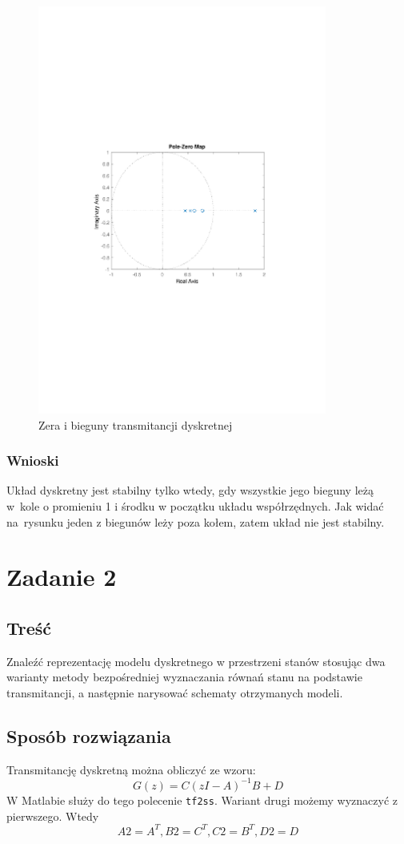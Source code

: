 \documentclass{article}
\begin{document}
\begin{figure}[H]
\centering
\includegraphics[clip, trim=3cm 9cm 3cm 9.5cm, width=9.5cm]{../rys/zad1_rys2.pdf}
\caption{Zera i bieguny transmitancji dyskretnej}
\label{fig:rys 2}
\end{figure}

\subsubsection{Wnioski}
Układ dyskretny jest stabilny tylko wtedy, gdy wszystkie jego bieguny leżą w~kole o promieniu 1 i środku w początku układu współrzędnych. Jak widać na~rysunku jeden z biegunów leży poza kołem, zatem układ nie jest stabilny.
\section{Zadanie 2}
\subsection{Treść}
Znaleźć reprezentację modelu dyskretnego w przestrzeni stanów stosując dwa warianty
metody bezpośredniej wyznaczania równań stanu na podstawie transmitancji, a następnie
narysować schematy otrzymanych modeli.
\subsection{Sposób rozwiązania}
Transmitancję dyskretną można obliczyć ze wzoru:
$$
G(z)=C(zI-A)^{-1}B+D
$$
W Matlabie służy do tego polecenie \verb+tf2ss+.
Wariant drugi możemy wyznaczyć z pierwszego.
Wtedy
$$
A2=A^T, B2=C^T, C2=B^T, D2=D
$$
\end{document}
